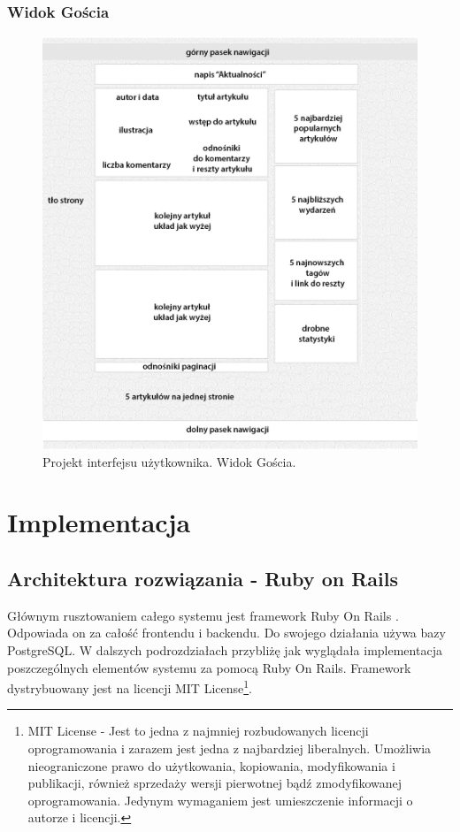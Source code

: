 \documentclass[openright]{xmgr}
\begin{document}
\newpage

\subsection{Widok Gościa}
\begin{figure}[!tbh]
\centering
\includegraphics[width=.9\linewidth]{fig/gui_guest}
\caption{Projekt interfejsu użytkownika. Widok Gościa.}
\end{figure}

\chapter{Implementacja}

\section{Architektura rozwiązania - Ruby on Rails}
Głównym rusztowaniem całego systemu jest framework Ruby On Rails \cite{ror} \cite{enterprise} \cite{wikibook} \cite{guides}. Odpowiada on za całość frontendu i backendu. Do swojego działania używa bazy PostgreSQL. W dalszych podrozdziałach przybliżę jak wyglądała implementacja poszczególnych elementów systemu za pomocą Ruby On Rails. Framework dystrybuowany jest na licencji MIT License\footnote{MIT License - Jest to jedna z najmniej rozbudowanych licencji oprogramowania i zarazem jest jedna z najbardziej liberalnych. Umożliwia nieograniczone prawo do użytkowania, kopiowania, modyfikowania i publikacji, również sprzedaży wersji pierwotnej bądź zmodyfikowanej oprogramowania. Jedynym wymaganiem jest umieszczenie informacji o autorze i licencji.}.
\end{document}
